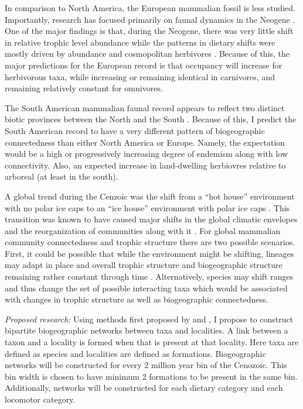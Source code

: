 \documentclass[12pt,letterpaper]{article}
\begin{document}
In comparison to North America, the European mammalian fossil is less studied. Importantly, research has focused primarily on faunal dynamics in the Neogene \citep{Jernvall2002,Jernvall2004,Liow2008,Raia2006,Raia2005,Raia2011c}. One of the major findings is that, during the Neogene, there was very little shift in relative trophic level abundance \citep{Jernvall2004} while the patterns in dietary shifts were mostly driven by abundance and cosmopolitan herbivores \citep{Jernvall2002}. Because of this, the major predictions for the European record is that occupancy will increase for herbivorous taxa, while increasing or remaining identical in carnivores, and remaining relatively constant for omnivores. 

The South American mammalian faunal record appears to reflect two distinct biotic provinces between the North and the South \citep{Macfadden1997,Macfadden2006,Flynn1998a,Patterson1968}. Because of this, I predict the South American record to have a very different pattern of biogeographic connectedness than either North America or Europe. Namely, the expectation would be a high or progressively increasing degree of endemism along with low connectivity. Also, an expected increase in land-dwelling herbiovres relative to arboreal (at least in the south).

A global trend during the Cenzoic was the shift from a ``hot house'' environment with no polar ice caps to an ``ice house'' environment with polar ice caps \citep{Zachos2008,Zachos2001}. This transition was known to have caused major shifts in the global climatic envelopes and the reorganization of communities along with it \citep{Janis1993a,Fortelius2002,Blois2009,Alroy2000g,Figueirido2012}. For global mammalian community connectedness and trophic structure there are two possible scenarios. First, it could be possible that while the environment might be shifting, lineages may adapt in place and overall trophic structure and biogeographic structure remaining rather constant through time \citep{Jernvall2004}. Alternatively, species may shift ranges and thus change the set of possible interacting taxa which would be associated with changes in trophic structure as well as biogeographic connectedness.

\textit{Proposed research:}
Using methods first proposed by \citet{Sidor2013} and \citet{Vilhena2013}, I propose to construct bipartite biogeographic networks between taxa and localities. A link between a taxon and a locality is formed when that is present at that locality. Here taxa are defined as species and localities are defined as formations. Biogeographic networks will be constructed for every 2 million year bin of the Cenozoic. This bin width is chosen to have minimum 2 formations to be present in the same bin. Additionally, networks will be constructed for each dietary category and each locomotor category. 
\end{document}
